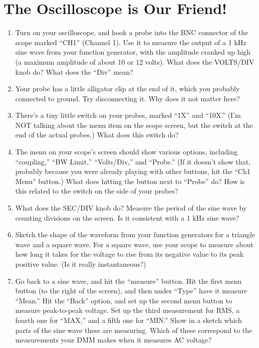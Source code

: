 \section{The Oscilloscope is Our Friend!}
\label{lab_oscilloscope}


\bigskip

\begin{enumerate}[wide]

\item Turn on your oscilloscope, and hook a probe into the BNC connector of the scope marked ``CH1'' (Channel 1).  Use it to measure the output of a 1 kHz sine wave from your function generator, with the amplitude cranked up high (a maximum amplitude of about 10 or 12 volts).  What does the VOLTS/DIV knob do?  What does the ``Div'' mean?

\item Your probe has a little alligator clip at the end of it, which you probably connected to ground.  Try disconnecting it.  Why does it not matter here?

\item There's a tiny little switch on your probes, marked ``1X'' and ``10X.'' (I'm NOT talking about the menu item on the scope screen, but the switch at the end of the actual probes.)  What does this switch do?

\item The menu on your scope's screen should show various options, including ``coupling,'' ``BW Limit,'' ``Volts/Div,'' and ``Probe.''  (If it doesn't show that, probably because you were already playing with other buttons, hit the ``Ch1 Menu'' button.)  What does hitting the button next to ``Probe'' do?  How is this related to the switch on the side of your probes?

\item What does the SEC/DIV knob do?  Measure the period of the sine wave by counting divisions on the screen.  Is it consistent with a 1 kHz sine wave?

\item Sketch the shape of the waveform from your function generators for a triangle wave and a square wave.  For a square wave, use your scope to measure about how long it takes for the voltage to rise from its negative value to its peak positive value.  (Is it really instantaneous?)

\item Go back to a sine wave, and hit the ``measure'' button.  Hit the first menu button (to the right of the screen), and then under ``Type'' have it measure ``Mean.''  Hit the ``Back'' option, and set up the second menu button to measure peak-to-peak voltage.  Set up the third measurement for RMS, a fourth one for ``MAX,'' and a fifth one for ``MIN.'' Show in a sketch which parts of the sine wave these are measuring.  Which of these correspond to the measurements your DMM makes when it measures AC voltage?


\end{enumerate}
